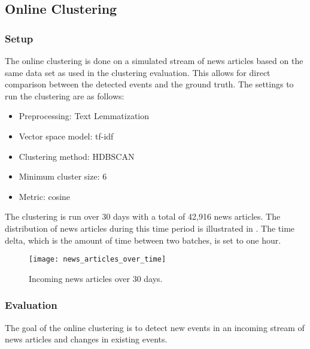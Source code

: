 \subsection{Online Clustering}
\label{subsec:5b_online_clustering}

\subsubsection{Setup}
\label{subsubsec:5b_setup}

The online clustering is done on a simulated stream of news articles
based on the same data set as used in the clustering evaluation.
This allows for direct comparison between the detected events and the ground truth.
The settings to run the clustering are as follows:

\begin{itemize}
    \item Preprocessing: Text Lemmatization
    \item Vector space model: tf-idf
    \item Clustering method: HDBSCAN
    \item Minimum cluster size: 6
    \item Metric: cosine
\end{itemize}

The clustering is run over 30 days with a total of 42,916 news articles.
The distribution of news articles during this time period is illustrated in .
The time delta, which is the amount of time between two batches, is set to one hour.

\begin{figure}[h]
    \centering
    \texttt{[image: news\_articles\_over\_time]}
    \caption{Incoming news articles over 30 days.}
    \label{fig:news_articles_over_time}
\end{figure}

\subsubsection{Evaluation}
\label{subsubsec:5b_evaluation}

The goal of the online clustering is to detect new events in an incoming stream
of news articles and changes in existing events.

